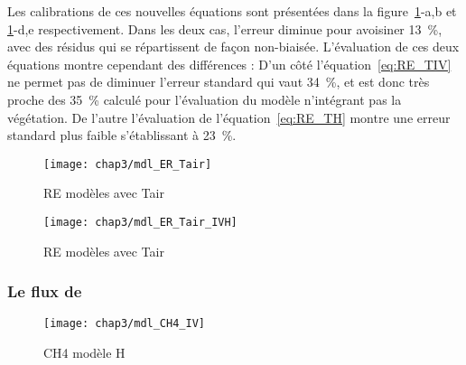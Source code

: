 Les calibrations de ces nouvelles équations sont présentées dans la figure~\ref{fig:mdl_ER_Tair}-a,b et \ref{fig:mdl_ER_Tair}-d,e respectivement.
Dans les deux cas, l'erreur diminue pour avoisiner \SI{13}{\percent}, avec des résidus qui se répartissent de façon non-biaisée.
L'évaluation de ces deux équations montre cependant des différences :
D'un côté l'équation~\ref{eq:RE_TIV} ne permet pas de diminuer l'erreur standard qui vaut \SI{34}{\percent}, et est donc très proche des \SI{35}{\percent} calculé pour l'évaluation du modèle n'intégrant pas la végétation.
De l'autre l'évaluation de l'équation~\ref{eq:RE_TH} montre une erreur standard plus faible s'établissant à \SI{23}{\percent}.

\begin{figure}
\centering
\texttt{[image: chap3/mdl\_ER\_Tair]}
\caption{RE modèles avec Tair}
\label{fig:mdl_ER_Tair}
\end{figure}

\begin{figure}
\centering
\texttt{[image: chap3/mdl\_ER\_Tair\_IVH]}
\caption{RE modèles avec Tair}
\label{fig:ER_mdl_TairIVH}
\end{figure}

%
%
%
%

\subsubsection{Le flux de \chh}

\begin{figure}
\centering
\texttt{[image: chap3/mdl\_CH4\_IV]}
\caption{CH4 modèle H}
\label{fig:CH4_mdl}
\end{figure}

